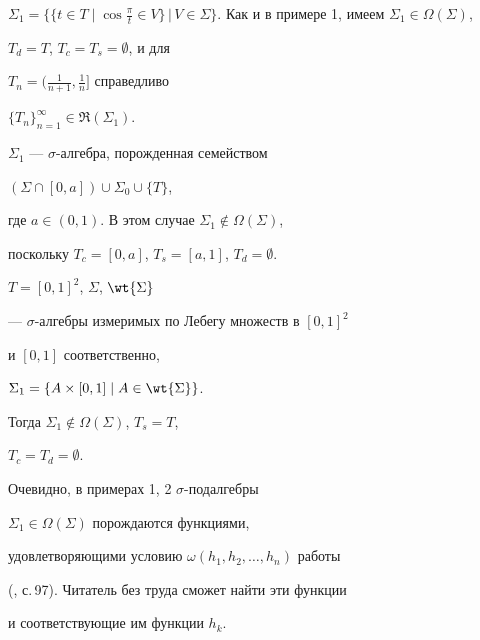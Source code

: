 \begin{exam}


$\Sigma_1=\big\{\{t\in T\mid


\cos\frac{\pi}{t}\in V\}\,\big |\,V\in\Sigma


\big\}$. Как и в примере 1, имеем $\Sigma_1\in{\Omega}(\Sigma)$,


$T_d=T$, $T_c=T_s=\emptyset$, и для


$T_n=\big(\frac{1}{n+1},\frac{1}{n}\big]$ справедливо


$\{T_n\}_{n=1}^\infty\in\Re(\Sigma_1)$.


\end{exam}





\begin{exam}


$\Sigma_1$ --- $\sigma$-ал\-геб\-ра, порожденная семейством


$(\Sigma\cap[0,a])\cup\Sigma_0\cup\{T\}$,


где $a\in (0,1)$. В этом случае $\Sigma_1\notin{\Omega}(\Sigma)$,


поскольку $T_c=[0,a]$, $T_s=[a,1]$, $T_d=\emptyset$.


\end{exam}





\begin{exam} $T=[0,1]^2$, $\Sigma$, $\wt{\Sigma}$


--- $\sigma$-ал\-геб\-ры измеримых по Лебегу множеств в $[0,1]^2$


и $[0,1]$ соответственно,


$\Sigma_1=\{A\times[0,1]\mid A\in\wt{\Sigma}\}$.


Тогда $\Sigma_1\notin{\Omega}(\Sigma)$, $T_s=T$,


$T_c=T_d=\emptyset$.


\end{exam}





Очевидно, в примерах 1, 2\; $\sigma$-подалгебры


$\Sigma_1\in\Omega(\Sigma)$ порождаются функциями,


удовлетворяющими условию $\omega(h_1,h_2,\dotsc,h_n)$ работы


(\cite{20}, с.\,97). Читатель без труда сможет найти эти функции


и соответствующие им функции $h_k$.





